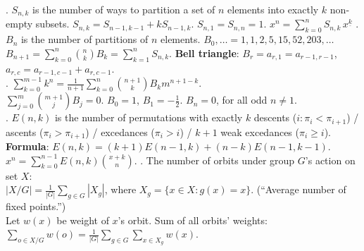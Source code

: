 .
$S_{n,k}$ is the number of ways to partition a set of $n$ elements into
exactly $k$ non-empty subsets.
$S_{n,k} = S_{n-1,k-1} + k S_{n-1,k}$.
$S_{n,1} = S_{n,n} = 1$.
$x^n = \sum_{k=0}^n S_{n,k}\,x^{\underline k}$ \TopicBreak
{}.
$B_n$ is the number of partitions of $n$ elements.
$B_0, \ldots = 1,1,2,5,15,52,203,\ldots$ \\
$B_{n+1} = \sum_{k=0}^n {n \choose k} B_k = \sum_{k=1}^n S_{n,k}$.
\textbf{Bell triangle}: $B_r=a_{r,1}=a_{r-1,r-1}$, $a_{r,c}=a_{r-1,c-1}+a_{r,c-1}$. \\
.
$\sum_{k=0}^{m-1} k^n =
\frac{1}{n+1} \sum_{k=0}^n {n+1 \choose k} B_k m^{n+1-k}$. \\
$\sum_{j=0}^m {m+1 \choose j} B_j = 0$.
\quad $B_0=1$, $B_1=-\frac{1}{2}$. $B_n=0$, for all odd $n \ne 1$. \\
.
$E(n,k)$ is the number of permutations with exactly
$k$ descents ($i: \pi_i < \pi_{i+1}$) /
ascents ($\pi_i > \pi_{i+1}$) /
excedances ($\pi_i > i$) /
$k+1$ weak excedances ($\pi_i \ge i$). \\
\textbf{Formula}: $E(n,k)=(k+1)E(n-1,k)+(n-k)E(n-1,k-1)$. \quad
$x^n = \sum_{k=0}^{n-1} E(n,k) {x+k \choose n}$. \TopicBreak
{}.
The number of orbits under group $G$'s action on set $X$:\\
$|X/G| = \frac{1}{|G|} \sum_{g \in G} |X_g|$,
where $X_g=\{ x \in X: g(x)=x \}$. (``Average number of fixed points.'') \\
Let $w(x)$ be weight of $x$'s orbit. Sum of all orbits' weights:
$\sum_{o \in X/G} w(o) = \frac{1}{|G|} \sum_{g \in G} \sum_{x \in X_g} w(x)$.


